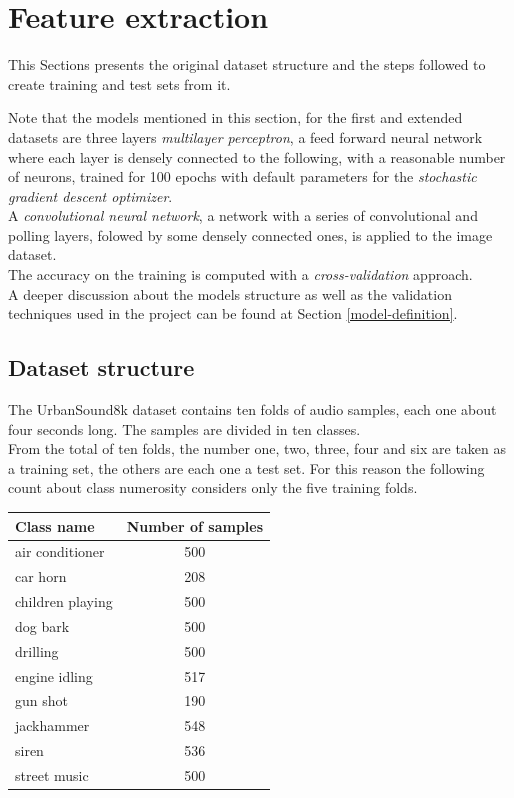 \section{Feature extraction}
\label{feature-extraction}

This Sections presents the original dataset structure and the 
steps followed to create training and test sets from it.

Note that the models mentioned in this section, for the first and 
extended datasets are
three layers \emph{multilayer perceptron}, 
a feed forward neural network where each layer 
is densely connected  to the following, 
with a reasonable number of neurons, trained 
for 100 epochs with default parameters for the \emph{stochastic gradient 
descent optimizer}.~\cite{mlp}\cite{sgd}\\
A \emph{convolutional neural network}, a network with 
a series of convolutional and polling layers, folowed by 
some densely connected ones, is applied to the image dataset.~\cite{cnn} \\
The accuracy on the training is computed with a \emph{cross-validation} 
approach.~\cite{cross}\\

A deeper discussion about the models structure as well as the validation
techniques used in the project can be found at Section \vref{model-definition}.

\subsection{Dataset structure}
\label{dataset-structure}

The UrbanSound8k dataset contains ten folds of audio samples, each one about 
four seconds long. The samples are divided in ten classes.\\
From the total of ten folds, the number one, two, three, four and six 
are taken as a training set, the others are each one a test set.
For this reason the following count about class numerosity considers
only the five training folds.

\begin{center}
    \begin{tabular}{ |l|c| } 
        \hline
        Class name & Number of samples \\
        \hline
        air conditioner & 500 \\
        car horn & 208 \\
        children playing & 500 \\
        dog bark & 500 \\
        drilling & 500 \\
        engine idling & 517 \\
        gun shot & 190 \\
        jackhammer & 548 \\
        siren & 536 \\
        street music & 500 \\
        \hline
    \end{tabular}
\end{center}

